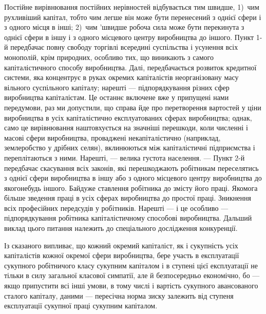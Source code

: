 Постійне вирівнювання постійних нерівностей відбувається
тим швидше, 1)~чим рухливіший капітал, тобто чим легше він
може бути перенесений з однієї сфери і з одного місця в інші;
2)~чим 'швидше робоча сила може бути перекинута з однієї
сфери в іншу і з одного місцевого центру виробництва до
іншого. Пункт 1-й передбачає повну свободу торгівлі всередині
суспільства і усунення всіх монополій, крім природних, особливо
тих, що виникають з самого капіталістичного способу виробництва.
Далі, передбачається розвиток кредитної системи, яка
концентрує в руках окремих капіталістів неорганізовану масу
вільного суспільного капіталу; нарешті — підпорядкування різних
сфер виробництва капіталістам. Це останнє включене вже
у припущені нами передумови, раз ми допустили, що справа
йде про перетворення вартостей у ціни виробництва в усіх капіталістично
експлуатованих сферах виробництва; однак, само
це вирівнювання наштовхується на значніші перешкоди, коли
численні і масові сфери виробництва, проваджені некапіталістично
(наприклад, землеробство у дрібних селян), вклинюються
між капіталістичні підприємства і переплітаються з ними. Нарешті,
— велика густота населення. — Пункт 2-й передбачає скасування
всіх законів, які перешкоджають робітникам переселятись
з однієї сфери виробництва в іншу або з одного місцевого
центру виробництва до якогонебудь іншого. Байдуже ставлення
робітника до змісту його праці. Якомога більше зведення праці
в усіх сферах виробництва до простої праці. Зникнення всіх професійних
передсудів у робітників. Нарешті — і це особливо —
підпорядкування робітника капіталістичному способові виробництва.
Дальший виклад цього питання належить до спеціального
дослідження конкуренції.

Із сказаного випливає, що кожний окремий капіталіст, як
і сукупність усіх капіталістів кожної окремої сфери виробництва,
бере участь в експлуатації сукупного робітничого класу сукупним
капіталом і в ступені цієї експлуатації не тільки в силу
загальної класової симпатії, але й безпосередньо економічно,
бо — якщо припустити всі інші умови, в тому числі і вартість
сукупного авансованого сталого капіталу, даними — пересічна
норма зиску залежить від ступеня експлуатації сукупної
праці сукупним капіталом.

